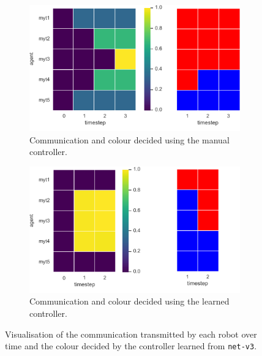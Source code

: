 \begin{figure}[!htb]
	\begin{subfigure}[h]{\textwidth}
		\centering
		\includegraphics[width=.6\textwidth]{contents/images/net-v3/net-v3-manual-0(1)}
		\caption{Communication and colour decided using the manual controller.}
	\end{subfigure}
	\hspace*{\fill}%
	\vspace*{8pt}%
	\hspace*{\fill}%
	\begin{subfigure}[h]{\textwidth}
		\centering			
		\includegraphics[width=.6\textwidth]{contents/images/net-v3/net-v3-learned-0(1)}
		\caption{Communication and colour decided using the learned controller.}
	\end{subfigure}
	\caption[Evaluation of the communication learned by 
	\texttt{net-v3}.]{Visualisation of the communication transmitted by each 
		robot over time and the colour decided by the controller learned from 
		\texttt{net-v3}.}	
	\label{fig:net-v3commcolour}
\end{figure}
\vspace{0.5cm}

